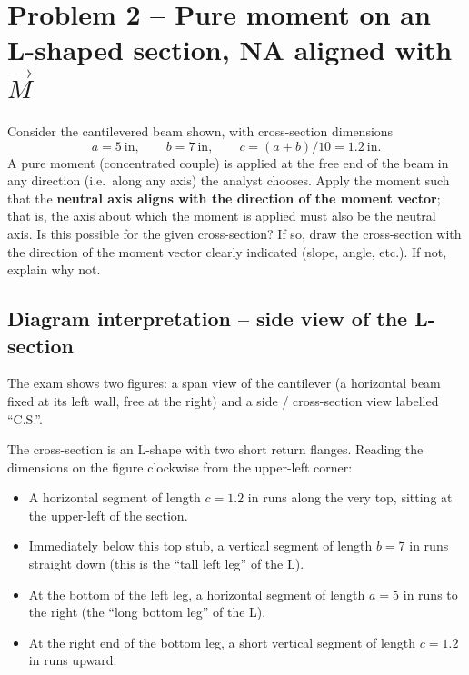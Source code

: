 \documentclass[11pt]{article}
\begin{document}
\section*{Problem 2 -- Pure moment on an L-shaped section, NA aligned with $\vec M$}

\begin{problembox}
Consider the cantilevered beam shown, with cross-section dimensions
$$a = 5\ \text{in},\qquad b = 7\ \text{in},\qquad c = (a+b)/10 = 1.2\ \text{in}.$$
A pure moment (concentrated couple) is applied at the free end of the beam in any direction (i.e.\ along any axis) the analyst chooses. Apply the moment such that the \textbf{neutral axis aligns with the direction of the moment vector}; that is, the axis about which the moment is applied must also be the neutral axis. Is this possible for the given cross-section? If so, draw the cross-section with the direction of the moment vector clearly indicated (slope, angle, etc.). If not, explain why not.
\end{problembox}

\subsection*{Diagram interpretation -- side view of the L-section}

The exam shows two figures: a span view of the cantilever (a horizontal beam fixed at its left wall, free at the right) and a side / cross-section view labelled ``C.S.''.

The cross-section is an L-shape with two short return flanges. Reading the dimensions on the figure clockwise from the upper-left corner:
\begin{itemize}[leftmargin=2em, itemsep=2pt]
  \item A horizontal segment of length $c = 1.2$ in runs along the very top, sitting at the upper-left of the section.
  \item Immediately below this top stub, a vertical segment of length $b = 7$ in runs straight down (this is the ``tall left leg'' of the L).
  \item At the bottom of the left leg, a horizontal segment of length $a = 5$ in runs to the right (the ``long bottom leg'' of the L).
  \item At the right end of the bottom leg, a short vertical segment of length $c = 1.2$ in runs upward.
\end{itemize}
\end{document}
